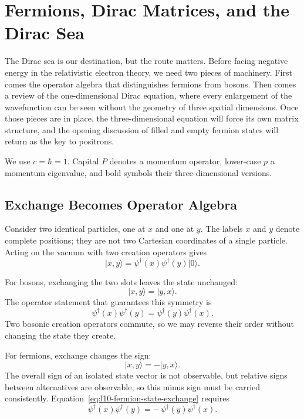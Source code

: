 \chapter{Fermions, Dirac Matrices, and the Dirac Sea}

The Dirac sea is our destination, but the route matters. Before facing negative energy in the relativistic electron theory, we need two pieces of machinery. First comes the operator algebra that distinguishes fermions from bosons. Then comes a review of the one-dimensional Dirac equation, where every enlargement of the wavefunction can be seen without the geometry of three spatial dimensions. Once those pieces are in place, the three-dimensional equation will force its own matrix structure, and the opening discussion of filled and empty fermion states will return as the key to positrons.

We use \(c=\hbar=1\). Capital \(P\) denotes a momentum operator, lower-case \(p\) a momentum eigenvalue, and bold symbols their three-dimensional versions.

\section{Exchange Becomes Operator Algebra}

Consider two identical particles, one at \(x\) and one at \(y\). The labels \(x\) and \(y\) denote complete positions; they are not two Cartesian coordinates of a single particle. Acting on the vacuum with two creation operators gives
\begin{equation}
\lvert x,y\rangle
=
\psi^\dagger(x)\psi^\dagger(y)\lvert0\rangle.
\label{eq:l10-two-particle-state}
\end{equation}

For bosons, exchanging the two slots leaves the state unchanged:
\begin{equation}
\lvert x,y\rangle=\lvert y,x\rangle.
\end{equation}
The operator statement that guarantees this symmetry is
\begin{equation}
\psi^\dagger(x)\psi^\dagger(y)
=
\psi^\dagger(y)\psi^\dagger(x).
\label{eq:l10-boson-exchange}
\end{equation}
Two bosonic creation operators commute, so we may reverse their order without changing the state they create.

For fermions, exchange changes the sign:
\begin{equation}
\lvert x,y\rangle=-\lvert y,x\rangle.
\label{eq:l10-fermion-state-exchange}
\end{equation}
The overall sign of an isolated state vector is not observable, but relative signs between alternatives are observable, so this minus sign must be carried consistently. Equation~\eqref{eq:l10-fermion-state-exchange} requires
\begin{equation}
\psi^\dagger(x)\psi^\dagger(y)
=
-\,\psi^\dagger(y)\psi^\dagger(x).
\label{eq:l10-fermion-operator-exchange}
\end{equation}


